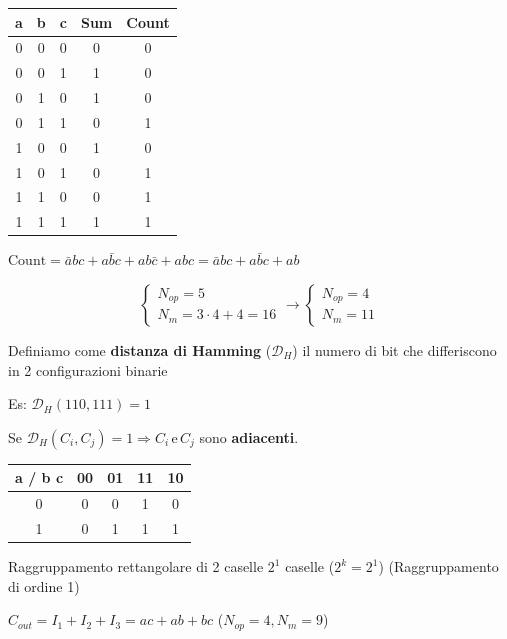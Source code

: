\documentclass{article}
\begin{document}
\begin{tabular}{c c c| c c}
    a & b & c & Sum & Count\\
    \hline
    0 & 0 & 0 & 0 & 0\\
    0 & 0 & 1 & 1 & 0\\
    0 & 1 & 0 & 1 & 0\\
    0 & 1 & 1 & 0 & 1\\
    1 & 0 & 0 & 1 & 0\\
    1 & 0 & 1 & 0 & 1\\
    1 & 1 & 0 & 0 & 1\\
    1 & 1 & 1 & 1 & 1\\
\end{tabular}


$\text{Count} = \bar{a}b c + a\bar{b} c + a b \bar{c} + a b c = \bar{a} b c + a \bar{b} c + ab$

\[
    \begin{cases}
        N_{op} = 5\\
        N_m = 3 \cdot 4 + 4 = 16
    \end{cases} \to
    \begin{cases}
        N_{op} = 4\\
        N_m = 11
    \end{cases}
\]

Definiamo come \textbf{distanza di Hamming} ($\mathcal{D}_H$) il numero di bit che differiscono in 2 configurazioni binarie

Es: $\mathcal{D}_H ( 1 1 0, 1 1 1) = 1$

Se $\mathcal{D}_H (C_i, C_j) = 1 \Rightarrow C_i\, \text{e}\, C_j$ sono \textbf{adiacenti}.



\begin{tabular}{c|c|c|c|c|}
    a / b c & 00 & 01 & 11 & 10\\
    \hline
    0 & 0 & 0 & 1 & 0\\
    \hline
    1 & 0 & 1 & 1 &  1\\
    \hline
\end{tabular}

Raggruppamento rettangolare di 2 caselle $2^1$ caselle ($2^k = 2^1$) (Raggruppamento di ordine 1)

$C_{out} = I_1 + I_2 + I_3 = ac + ab + bc$ \qquad($N_{op} = 4 , N_m = 9$)
\end{document}
